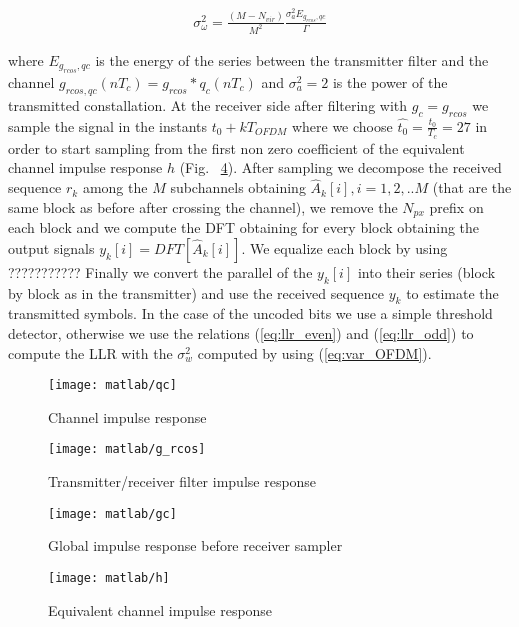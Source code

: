 \documentclass[a4paper,oneside]{article}
\begin{document}
\begin{align*}
\sigma_{\omega}^2 = \frac{(M-N_{vir})}{M^2}\frac{\sigma_{a}^2 E_{g_{rcos},qc}}{\Gamma}
\label{eq:var_OFDM}
\end{align*}

where $E_{g_{rcos},qc}$ is the energy of the series between the transmitter filter and the channel $g_{rcos,qc}(nT_c) = g_{rcos}*q_c(nT_c)$ and $\sigma_a^2 = 2$ is the power of the transmitted constallation.
\newline At the receiver side after filtering with $g_c = g_{rcos}$ we sample the signal in the instants $t_0 + kT_{OFDM}$ where we choose $\hat{t_0} = \frac{t_0}{T_c} = 27$ in order to start sampling from the first non zero coefficient of the equivalent channel impulse response $h$ (Fig. ~\ref{plot:h}). After sampling we decompose the received sequence $r_k$ among the $M$ subchannels obtaining $\hat{A}_k[i], i = 1,2,..M$ (that are the same block as before after crossing the channel), we remove the $N_{px}$ prefix on each block and we compute the DFT obtaining for every block obtaining the output signals $y_k[i] = DFT[\hat{A}_k[i]]$. We equalize each block by using ??????????? Finally we convert the parallel of the $y_k[i]$ into their series (block by block as in the transmitter) and use the received sequence $y_k$ to estimate the transmitted symbols. 
\newline In the case of the uncoded bits we use a simple threshold detector, otherwise we use the relations (\ref{eq:llr_even}) and (\ref{eq:llr_odd}) to compute the LLR with the $\sigma^2_w$ computed by using (\ref{eq:var_OFDM}).

\begin{figure}[htbp]
  \centering
  \texttt{[image: matlab/qc]}
  \caption{Channel impulse response}
  \label{plot:qc}
\end{figure}

\begin{figure}[htbp]
  \centering
  \texttt{[image: matlab/g\_rcos]}
  \caption{Transmitter/receiver filter impulse response}
  \label{plot:g_rcos}
\end{figure}

\begin{figure}[htbp]
  \centering
  \texttt{[image: matlab/gc]}
  \caption{Global impulse response before receiver sampler}
  \label{plot:gc}
\end{figure}

\begin{figure}[htbp]
  \centering
  \texttt{[image: matlab/h]}
  \caption{Equivalent channel impulse response}
  \label{plot:h}
\end{figure}
\end{document}

